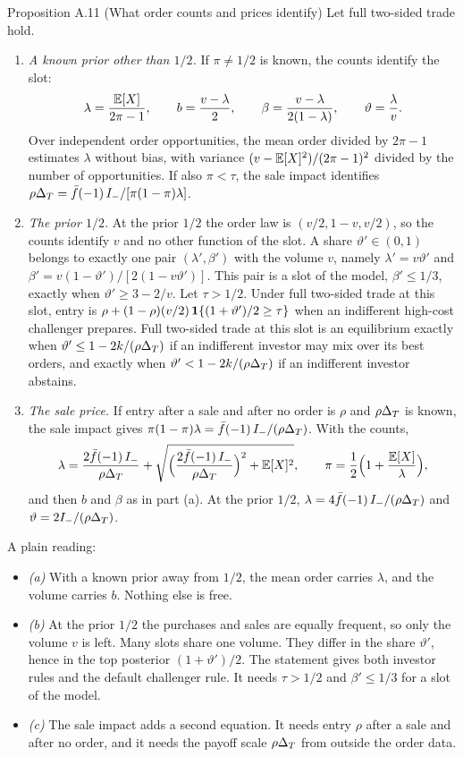 \begin{paperresult}{Proposition A.11 (What order counts and prices identify)}
Let full two-sided trade hold.
\begin{enumerate}[label=(\alph*),leftmargin=2em]
\item \emph{A known prior other than \(1/2\).} If \(\pi\ne1/2\) is known, the counts identify the slot:
\[
\lambda=\frac{\mathbb{E}[X]}{2\pi-1},\qquad b=\frac{v-\lambda}{2},\qquad \beta=\frac{v-\lambda}{2(1-\lambda)},\qquad \vartheta=\frac{\lambda}{v}.
\]
Over independent order opportunities, the mean order divided by \(2\pi-1\) estimates \(\lambda\) without bias, with variance \((v-\mathbb{E}[X]^2)/(2\pi-1)^2\) divided by the number of opportunities. If also \(\pi<\tau\), the sale impact identifies \(\rho\Delta_T=\bar f(-1)\,I_-/[\pi(1-\pi)\lambda]\).
\item \emph{The prior \(1/2\).} At the prior \(1/2\) the order law is \((v/2,1-v,v/2)\), so the counts identify \(v\) and no other function of the slot. A share \(\vartheta'\in(0,1)\) belongs to exactly one pair \((\lambda',\beta')\) with the volume \(v\), namely \(\lambda'=v\vartheta'\) and \(\beta'=v(1-\vartheta')/[2(1-v\vartheta')]\). This pair is a slot of the model, \(\beta'\le1/3\), exactly when \(\vartheta'\ge3-2/v\). Let \(\tau>1/2\). Under full two-sided trade at this slot, entry is \(\rho+(1-\rho)(v/2)\,\mathbf{1}\{(1+\vartheta')/2\ge\tau\}\) when an indifferent high-cost challenger prepares. Full two-sided trade at this slot is an equilibrium exactly when \(\vartheta'\le1-2k/(\rho\Delta_T)\) if an indifferent investor may mix over its best orders, and exactly when \(\vartheta'<1-2k/(\rho\Delta_T)\) if an indifferent investor abstains.
\item \emph{The sale price.} If entry after a sale and after no order is \(\rho\) and \(\rho\Delta_T\) is known, the sale impact gives \(\pi(1-\pi)\lambda=\bar f(-1)\,I_-/(\rho\Delta_T)\). With the counts,
\[
\lambda=\frac{2\bar f(-1)\,I_-}{\rho\Delta_T}+\sqrt{\Bigl(\frac{2\bar f(-1)\,I_-}{\rho\Delta_T}\Bigr)^2+\mathbb{E}[X]^2},\qquad
\pi=\frac12\Bigl(1+\frac{\mathbb{E}[X]}{\lambda}\Bigr),
\]
and then \(b\) and \(\beta\) as in part (a). At the prior \(1/2\), \(\lambda=4\bar f(-1)\,I_-/(\rho\Delta_T)\) and \(\vartheta=2I_-/(\rho\Delta_T)\).
\end{enumerate}
\end{paperresult}

A plain reading:
\begin{itemize}
\item \emph{(a)} With a known prior away from \(1/2\), the mean order carries \(\lambda\), and the volume carries \(b\). Nothing else is free.
\item \emph{(b)} At the prior \(1/2\) the purchases and sales are equally frequent, so only the volume \(v\) is left. Many slots share one volume. They differ in the share \(\vartheta'\), hence in the top posterior \((1+\vartheta')/2\). The statement gives both investor rules and the default challenger rule. It needs \(\tau>1/2\) and \(\beta'\le1/3\) for a slot of the model.
\item \emph{(c)} The sale impact adds a second equation. It needs entry \(\rho\) after a sale and after no order, and it needs the payoff scale \(\rho\Delta_T\) from outside the order data.
\end{itemize}

